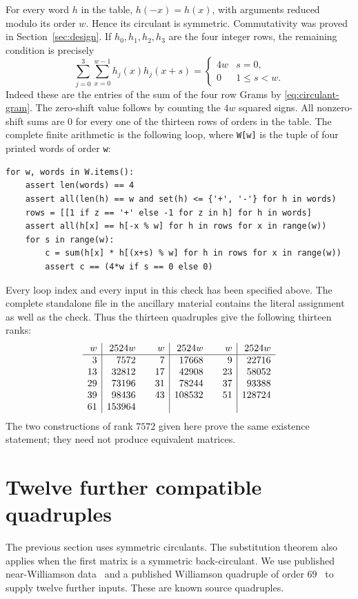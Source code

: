 \documentclass[10pt]{article}
\begin{document}
For every word $h$ in the table, $h(-x)=h(x)$, with arguments reduced
modulo its order $w$. Hence its circulant is symmetric. Commutativity was
proved in Section~\ref{sec:design}. If $h_0,h_1,h_2,h_3$ are the four
integer rows, the remaining condition is precisely
\[
 \sum_{j=0}^3\sum_{x=0}^{w-1}h_j(x)h_j(x+s)
 =\begin{cases}4w&s=0,\\0&1\leq s<w.\end{cases}
\]
Indeed these are the entries of the sum of the four row Grams by
\eqref{eq:circulant-gram}. The zero-shift value follows by counting the
$4w$ squared signs. All nonzero-shift sums are $0$ for every one of the
thirteen rows of orders in the table. The complete finite arithmetic is
the following loop, where \texttt{W[w]} is the tuple of four printed words
of order \texttt{w}:
\begin{verbatim}
for w, words in W.items():
    assert len(words) == 4
    assert all(len(h) == w and set(h) <= {'+', '-'} for h in words)
    rows = [[1 if z == '+' else -1 for z in h] for h in words]
    assert all(h[x] == h[-x % w] for h in rows for x in range(w))
    for s in range(w):
        c = sum(h[x] * h[(x+s) % w] for h in rows for x in range(w))
        assert c == (4*w if s == 0 else 0)
\end{verbatim}
Every loop index and every input in this check has been specified above.
The complete standalone file in the ancillary material contains the
literal assignment as well as the check.
Thus the thirteen quadruples give the following thirteen ranks:
\[
\begin{array}{r|r@{\qquad}r|r@{\qquad}r|r}
w&2524w&w&2524w&w&2524w\\\hline
3&7572&7&17668&9&22716\\
13&32812&17&42908&23&58052\\
29&73196&31&78244&37&93388\\
39&98436&43&108532&51&128724\\
61&153964&&&&
\end{array}
\]
The two constructions of rank $7572$ given here prove the same existence
statement; they need not produce equivalent matrices.



\section{Twelve further compatible quadruples}\label{sec:additional-quadruples}

The previous section uses symmetric circulants. The substitution theorem
also applies when the first matrix is a symmetric back-circulant. We use
published near-Williamson data~\cite{near-williamson} and a published
Williamson quadruple of order $69$~\cite{williamson69} to supply twelve
further inputs. These are known source quadruples.
\end{document}
